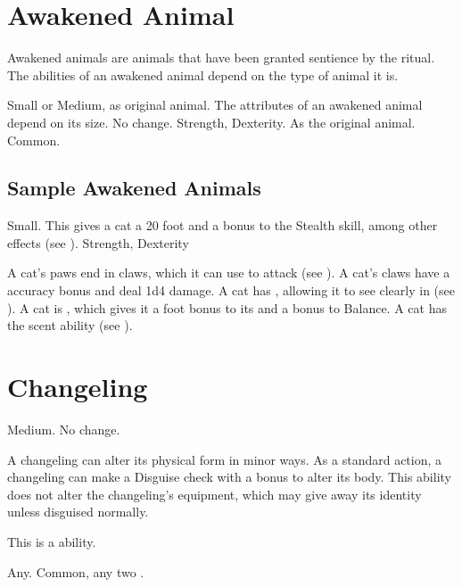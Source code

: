 \section{Awakened Animal}

Awakened animals are animals that have been granted sentience by the  ritual.
The abilities of an awakened animal depend on the type of animal it is.

 Small or Medium, as original animal.
 The attributes of an awakened animal depend on its size.
 No change.
  Strength,  Dexterity.
 As the original animal.
 Common.

\subsection{Sample Awakened Animals}


 Small. This gives a cat a 20 foot  and a  bonus to the Stealth skill, among other effects (see ).
  Strength,  Dexterity
\begin{itemize}
	 A cat's paws end in claws, which it can use to attack (see ). A cat's claws have a  accuracy bonus and deal 1d4 damage.
	 A cat has , allowing it to see clearly in  (see ).
	 A cat is , which gives it a  foot bonus to its  and a  bonus to Balance.
	 A cat has the scent ability (see ).
\end{itemize}

\section{Changeling}

 Medium.
 No change.
\begin{itemize}
	 A changeling can alter its physical form in minor ways. As a standard action, a changeling can make a Disguise check with a  bonus to alter its body. This ability does not alter the changeling's equipment, which may give away its identity unless disguised normally.

	      This is a \magical ability.
\end{itemize}
 Any.
 Common, any two .


